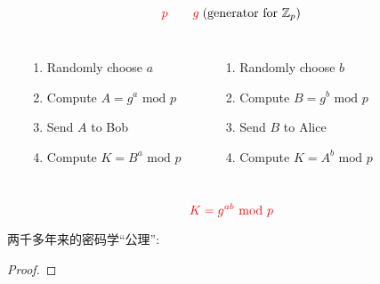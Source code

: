 \begin{frame}
  \[
	\textcolor{red}{p} \qquad \textcolor{red}{g} \;\text{(generator for $\mathbb{Z}_{p}$)} 
  \]

  \pause
  \begin{columns}
	  \begin{center}
	  \end{center}

	  \begin{enumerate}
		\setlength{\itemsep}{6pt}
		\item Randomly choose $a$
		\item Compute $A = g^a \text{ mod } p$
		\item Send $A$ to Bob
		\item Compute $K = B^a \text{ mod } p$
	  \end{enumerate}
	  \begin{center}
	  \end{center}

	  \begin{enumerate}
		\setlength{\itemsep}{6pt}
		\item Randomly choose $b$
		\item Compute $B = g^b \text{ mod } p$
		\item Send $B$ to Alice 
		\item Compute $K = A^b \text{ mod } p$
	  \end{enumerate}
  \end{columns}

  \pause
  \vspace{0.60cm}
  \[
	\textcolor{red}{K = g^{ab} \text{ mod } p}
  \]

  \pause
  \begin{center}
  \end{center}
\end{frame}

\begin{frame}

  \begin{center}
  \end{center}
\end{frame}

\begin{frame}

  \begin{center}
  \end{center}
\end{frame}

\begin{frame}
  \begin{alertblock}{两千多年来的密码学``公理'':}
	\centering
  \end{alertblock}

  \pause
  \begin{proof}
  \end{proof}
\end{frame}

